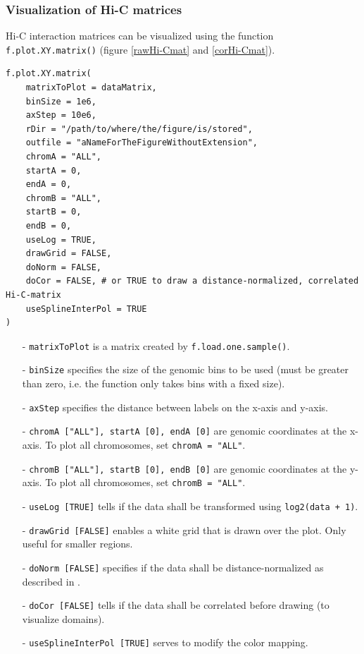 \documentclass[a4paper,10pt]{article}
\begin{document}
\clearpage
\subsubsection{Visualization of Hi-C matrices}
Hi-C interaction matrices can be visualized using the function \texttt{f.plot.XY.matrix()} (figure \ref{rawHi-Cmat} and \ref{corHi-Cmat}).
\begin{verbatim}
f.plot.XY.matrix(
    matrixToPlot = dataMatrix,
    binSize = 1e6,
    axStep = 10e6,
    rDir = "/path/to/where/the/figure/is/stored",
    outfile = "aNameForTheFigureWithoutExtension",
    chromA = "ALL",
    startA = 0,
    endA = 0,
    chromB = "ALL",
    startB = 0,
    endB = 0,
    useLog = TRUE,
    drawGrid = FALSE,
    doNorm = FALSE,
    doCor = FALSE, # or TRUE to draw a distance-normalized, correlated Hi-C-matrix
    useSplineInterPol = TRUE
)
\end{verbatim}
\begin{itemize}
 \item[-] \texttt{matrixToPlot} is a matrix created by \texttt{f.load.one.sample()}.
 \item[-] \texttt{binSize} specifies the size of the genomic bins to be used (must be greater than zero, i.e. the function only takes bins with a fixed size).
 \item[-] \texttt{axStep} specifies the distance between labels on the x-axis and y-axis.
 \item[-] \texttt{chromA ["ALL"], startA [0], endA [0]} are genomic coordinates at the x-axis. To plot all chromosomes, set \texttt{chromA = "ALL"}.
 \item[-] \texttt{chromB ["ALL"], startB [0], endB [0]} are genomic coordinates at the y-axis. To plot all chromosomes, set \texttt{chromB = "ALL"}.
 \item[-] \texttt{useLog [TRUE]} tells if the data shall be transformed using \texttt{log2(data + 1)}.
 \item[-] \texttt{drawGrid [FALSE]} enables a white grid that is drawn over the plot. Only useful for smaller regions.
 \item[-] \texttt{doNorm [FALSE]} specifies if the data shall be distance-normalized as described in \cite{2009_LiebermanAiden}.
 \item[-] \texttt{doCor [FALSE]} tells if the data shall be correlated before drawing (to visualize domains). 
 \item[-] \texttt{useSplineInterPol [TRUE]} serves to modify the color mapping.
\end{itemize}
\end{document}
